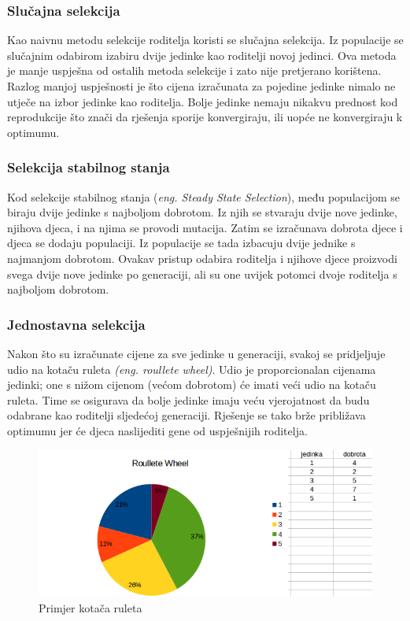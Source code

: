 \documentclass[times, utf8, zavrsni, numeric]{fer}
\begin{document}
\subsubsection{Slučajna selekcija}
Kao naivnu metodu selekcije roditelja koristi se slučajna selekcija. Iz populacije se slučajnim odabirom izabiru dvije jedinke kao roditelji novoj jedinci. Ova metoda je manje uspješna od ostalih metoda selekcije i zato nije pretjerano korištena. Razlog manjoj uspješnosti je što cijena izračunata za pojedine jedinke nimalo ne utječe na izbor jedinke kao roditelja. Bolje jedinke nemaju nikakvu prednost kod reprodukcije što znači da rješenja sporije konvergiraju, ili uopće ne konvergiraju k optimumu.

\subsubsection{Selekcija stabilnog stanja}
Kod selekcije stabilnog stanja (\textit{eng. Steady State Selection}), među populacijom se biraju dvije jedinke s najboljom dobrotom. Iz njih se stvaraju dvije nove jedinke, njihova djeca, i na njima se provodi mutacija. Zatim se izračunava dobrota djece i djeca se dodaju populaciji. Iz populacije se tada izbacuju dvije jednike s najmanjom dobrotom. Ovakav pristup odabira roditelja i njihove djece proizvodi svega dvije nove jedinke po generaciji, ali su one uvijek potomci dvoje roditelja s najboljom dobrotom.  

\subsubsection{Jednostavna selekcija}
Nakon što su izračunate cijene za sve jedinke u generaciji, svakoj se pridjeljuje udio na kotaču ruleta \textit{(eng. roullete wheel)}. Udio je proporcionalan cijenama jedinki; one s nižom cijenom (većom dobrotom) će imati veći udio na kotaču ruleta. Time se osigurava da bolje jedinke imaju veću vjerojatnost da budu odabrane kao roditelji sljedećoj generaciji. Rješenje se tako brže približava optimumu jer će djeca naslijediti gene od uspješnijih roditelja. 

\begin{figure}[htb]
\centering
\includegraphics[width=14cm]{images/roullete_wheel_selection.png}
\caption{Primjer kotača ruleta}
\label{fig:roullete wheel}
\end{figure}
\end{document}
